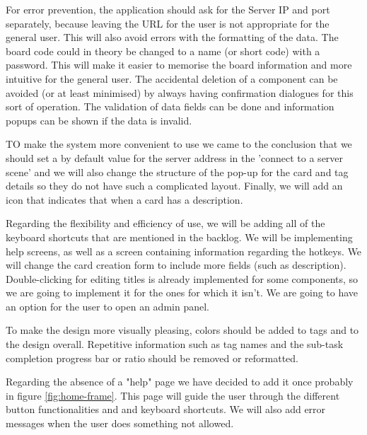 For error prevention, the application should ask for the Server IP and port separately, because leaving the URL for the user is not appropriate for the general user. This will also avoid errors with the formatting of the data. The board code could in theory be changed to a name (or short code) with a password. This will make it easier to memorise the board information and more intuitive for the general user. The accidental deletion of a component can be avoided (or at least minimised) by always having confirmation dialogues for this sort of operation. The validation of data fields can be done and information popups can be shown if the data is invalid.

TO make the system more convenient to use we came to the conclusion that we should set a by default value for the server address in the 'connect to a server scene' and we will also change the structure of the pop-up for the card and tag details so they do not have such a complicated layout. Finally, we will add an icon that indicates that when a card has a description.

Regarding the flexibility and efficiency of use, we will be adding all of the keyboard shortcuts that are mentioned in the backlog. We will be implementing help screens, as well as a screen containing information regarding the hotkeys. We will change the card creation form to include more fields (such as description). Double-clicking for editing titles is already implemented for some components, so we are going to implement it for the ones for which it isn't. We are going to have an option for the user to open an admin panel.

To make the design more visually pleasing, colors should be added to tags and to the design overall. Repetitive information such as tag names and the sub-task completion progress bar or ratio should be removed or reformatted.

Regarding the absence of a "help" page we have decided to add it once probably in figure \ref{fig:home-frame}. This page will guide the user through the different button functionalities and and keyboard shortcuts.  We will also add error messages when the user does something not allowed.
 